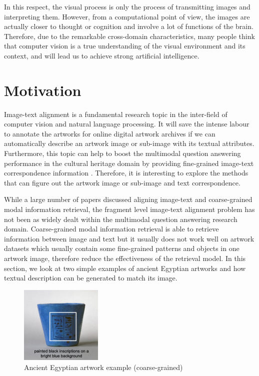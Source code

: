 In this respect, the visual process is only the process of transmitting images and interpreting them. However, from a computational point of view, the images are actually closer to thought or cognition and involve a lot of functions of the brain. Therefore, due to the remarkable cross-domain characteristics, many people think that computer vision is a true understanding of the visual environment and its context, and will lead us to achieve strong artificial intelligence.

\section{Motivation}
Image-text alignment is a fundamental research topic in the inter-field of computer vision and natural language processing. It will save the intense labour to annotate the artworks for online
digital artwork archives if we can automatically describe an artwork image or sub-image with its textual attributes. Furthermore, this topic can help to boost the multimodal question answering performance in the cultural heritage domain by providing fine-grained image-text correspondence information \cite{mqa}. Therefore, it is interesting to explore the methods that can figure out the artwork image or sub-image and text correspondence.

While a large number of papers discussed aligning image-text and  coarse-grained modal information retrieval, the fragment level image-text alignment problem has not been as widely dealt within the multimodal question answering research domain. Coarse-grained modal information retrieval is able to retrieve information between image and text but it usually does not work well on artwork datasets which usually contain some fine-grained patterns and objects in one artwork image, therefore reduce the effectiveness of the retrieval model. In this section, we look at two simple examples of ancient Egyptian artworks and how textual description can be generated to match its image.

\begin{figure}[h!]
\centering
\includegraphics[width=0.35\textwidth]{artwork_fine1.pdf}
\caption{Ancient Egyptian artwork example (coarse-grained)}
\label{fig:artwork1}
\end{figure}

